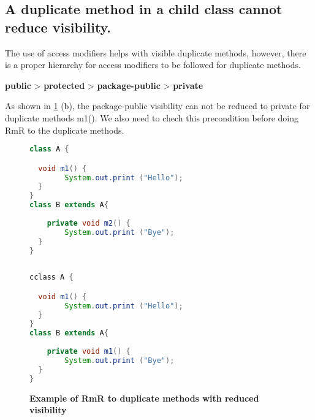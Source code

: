 \subsection{A duplicate method in a child class cannot reduce visibility.}

The use of access modifiers helps with visible duplicate methods, however, there is a proper hierarchy for access modifiers to be followed for duplicate methods.

\textbf{public} > \textbf{protected} > \textbf{package-public} > \textbf{private}

As shown in \ref{fig:RmR3} (b), the package-public visibility can not be reduced to private for duplicate methods m1(). We also need to chech this precondition before doing RmR to the duplicate methods.

\begin{figure}[th]
\centering
\begin{minipage}[t]{0.45\linewidth}
\begin{lstlisting}[language=java, basicstyle=\scriptsize\ttfamily,frame=single]
class A {

  void m1() {
		System.out.print ("Hello");
  }
}
class B extends A{
 
	private void m2() {
		System.out.print ("Bye");
  }	
}
 
\end{lstlisting}
\end{minipage}
\hfill
\begin{minipage}[t]{0.45\linewidth}
\begin{lstlisting}[language=java, basicstyle=\scriptsize\ttfamily,frame=single]
cclass A {

  void m1() {
		System.out.print ("Hello");
  }
}
class B extends A{
 
	private void m1() {
		System.out.print ("Bye");
  }	
}

\end{lstlisting}
\end{minipage}
\caption{\textbf{Example of RmR to duplicate methods with reduced visibility}}
\label{fig:RmR3}
\end{figure}